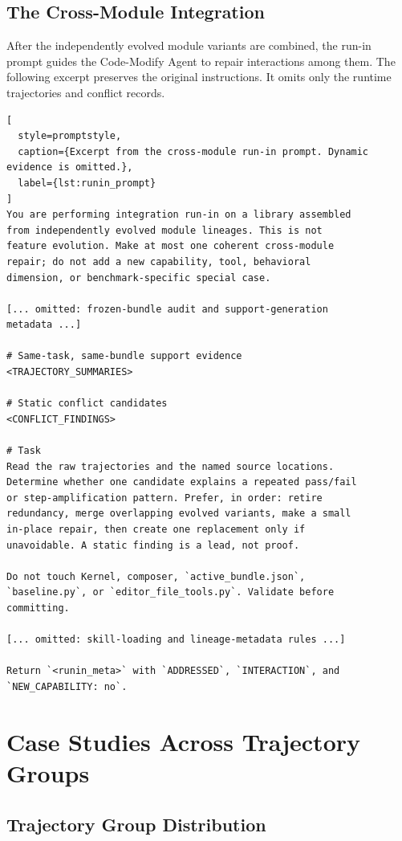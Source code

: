 \documentclass{article} %
\begin{document}
\subsection{The Cross-Module Integration}
\label{appendix:merge_mechanism}

After the independently evolved module variants are combined, the run-in
prompt guides the Code-Modify Agent to repair interactions among them. The
following excerpt preserves the original instructions. It omits only the
runtime trajectories and conflict records.

\begin{lstlisting}[
  style=promptstyle,
  caption={Excerpt from the cross-module run-in prompt. Dynamic evidence is omitted.},
  label={lst:runin_prompt}
]
You are performing integration run-in on a library assembled
from independently evolved module lineages. This is not
feature evolution. Make at most one coherent cross-module
repair; do not add a new capability, tool, behavioral
dimension, or benchmark-specific special case.

[... omitted: frozen-bundle audit and support-generation
metadata ...]

# Same-task, same-bundle support evidence
<TRAJECTORY_SUMMARIES>

# Static conflict candidates
<CONFLICT_FINDINGS>

# Task
Read the raw trajectories and the named source locations.
Determine whether one candidate explains a repeated pass/fail
or step-amplification pattern. Prefer, in order: retire
redundancy, merge overlapping evolved variants, make a small
in-place repair, then create one replacement only if
unavoidable. A static finding is a lead, not proof.

Do not touch Kernel, composer, `active_bundle.json`,
`baseline.py`, or `editor_file_tools.py`. Validate before
committing.

[... omitted: skill-loading and lineage-metadata rules ...]

Return `<runin_meta>` with `ADDRESSED`, `INTERACTION`, and
`NEW_CAPABILITY: no`.
\end{lstlisting}



\section{Case Studies Across Trajectory Groups}
\label{appendix:trajectory_group_cases}

\subsection{Trajectory Group Distribution}
\label{sec:contrastive_coverage}
\end{document}
